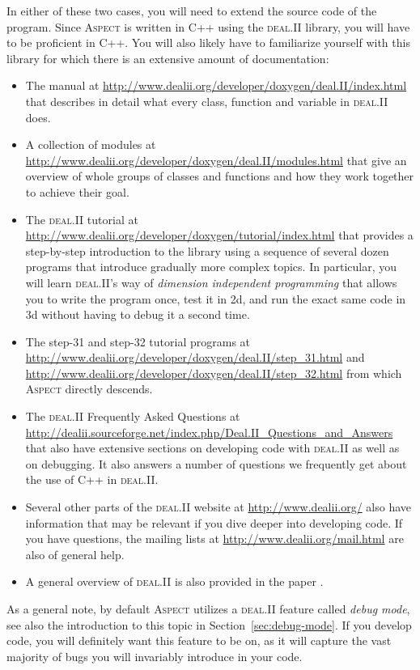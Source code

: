 \documentclass{article}
\newcommand{\dealii}{{\textsc{deal.II}}}
\newcommand{\aspect}{\textsc{Aspect}}
\begin{document}
In either of these two cases, you will need to extend the source code of the
program. Since \aspect{} is written in C++ using the \dealii{} library, you
will have to be proficient in C++. You will also likely have
to familiarize yourself with this library for which there is an extensive
amount of documentation:
\begin{itemize}
\item The manual at
  \url{http://www.dealii.org/developer/doxygen/deal.II/index.html} that
  describes in detail what every class, function and variable in \dealii{}
  does.
\item A collection of modules at
  \url{http://www.dealii.org/developer/doxygen/deal.II/modules.html} that give
  an overview of whole groups of classes and functions and how they work
  together to achieve their goal.
\item The \dealii{} tutorial at
  \url{http://www.dealii.org/developer/doxygen/tutorial/index.html} that
  provides a step-by-step introduction to the library using a sequence of
  several dozen programs that introduce gradually more complex topics. In
  particular, you will learn \dealii's way of \textit{dimension independent
  programming} that allows you to write the program once, test it in 2d, and
  run the exact same code in 3d without having to debug it a second time.
\item The step-31 and step-32 tutorial programs at
  \url{http://www.dealii.org/developer/doxygen/deal.II/step_31.html} and
  \url{http://www.dealii.org/developer/doxygen/deal.II/step_32.html} from
  which \aspect{} directly descends.
\item The \dealii{} Frequently Asked Questions at
  \url{http://dealii.sourceforge.net/index.php/Deal.II_Questions_and_Answers}
  that also have extensive sections on developing code with \dealii{} as well
  as on debugging. It also answers a number of questions we frequently get
  about the use of C++ in \dealii{}.
\item Several other parts of the \dealii{} website at
  \url{http://www.dealii.org/} also have information that may be relevant if
  you dive deeper into developing code. If you have questions, the mailing
  lists at \url{http://www.dealii.org/mail.html} are also of general help.
\item A general overview of \dealii{} is also provided in the paper
  \cite{BHK07}.
\end{itemize}

As a general note, by default \aspect{} utilizes a \dealii{} feature called \textit{debug
  mode}, see also the introduction to this topic in
Section~\ref{sec:debug-mode}. If you develop code, you will definitely want
this feature to be on, as it will capture the vast majority of bugs you
will invariably introduce in your code.
\end{document}
